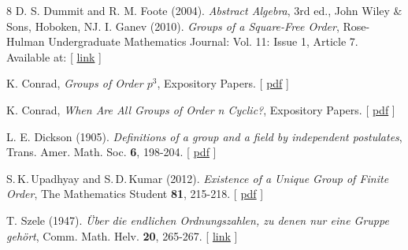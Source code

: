 \documentclass[12pt,reqno]{amsart}
\theoremstyle{plain}
\theoremstyle{definition}
\numberwithin{equation}{section}
\begin{document}
\begin{thebibliography}{8}
D. S. Dummit and R. M. Foote (2004).
\emph{Abstract Algebra}, 3rd ed.,
John Wiley \& Sons, Hoboken, NJ.
\vskip 5pt
 I. Ganev (2010). {\it Groups of a Square-Free Order}, Rose-Hulman Undergraduate Mathematics Journal: Vol. 11: Issue 1, Article 7. Available at: [ \href{https://scholar.rose-hulman.edu/rhumj/vol11/iss1/7}{link} ] \vskip 5pt


 K. Conrad, \emph{Groups of Order $p^3$}, Expository Papers. [ \href{https://kconrad.math.uconn.edu/blurbs/grouptheory/groupsp3.pdf}{pdf} ]\vskip 5pt 

 K. Conrad, \emph{When Are All Groups of Order n Cyclic?}, Expository Papers. [ \href{https://kconrad.math.uconn.edu/blurbs/grouptheory/allgrouporderncyclic.pdf}{pdf} ]\vskip 5pt 

 L. E. Dickson (1905). \emph{Definitions of a group and a field by independent postulates}, Trans. Amer. Math. Soc. \textbf{6}, 198-204. [ \href{http://www.ams.org/journals/tran/1905-006-02/S0002-9947-1905-1500706-2/S0002-9947-1905-1500706-2.pdf}{pdf} ]\vskip 5pt 

 S.\,K.\,Upadhyay and S.\,D.\,Kumar (2012). \emph{Existence of a Unique Group of Finite Order}, The Mathematics Student \textbf{81}, 215-218. [ \href{http://www.indianmathsociety.org.in/mathstudent2012.pdf}{pdf} ]\vskip 5pt 

 T. Szele (1947). \emph{\"Uber die endlichen Ordnungszahlen, zu denen nur eine Gruppe geh\"ort}, Comm. Math. Helv. \textbf{20}, 265-267. [ \href{https://eudml.org/doc/138922}{link} ]\vskip 5pt 

\end{thebibliography}
\end{document}
